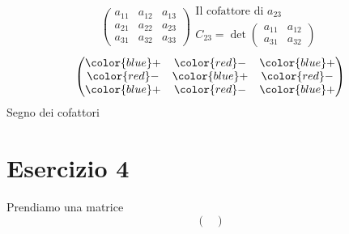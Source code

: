 \begin{equation*}
  \begin{pmatrix}
    a_{11} & a_{12} & a_{13}\\
    a_{21} & a_{22} & a_{23}\\
    a_{31} & a_{32} & a_{33}
  \end{pmatrix}
  \begin{array}{c}
    \text{Il cofattore di } a_{23}\\
    C_{23} = \det
    \begin{pmatrix}
      a_{11} & a_{12}\\
      a_{31} & a_{32}
    \end{pmatrix}
  \end{array}
\end{equation*}
\begin{equation*}
  \begin{pmatrix}
    {\color{blue}+} & {\color{red}-} &  {\color{blue}+}\\
    {\color{red}-} &{\color{blue}+}& {\color{red}-}\\
    {\color{blue}+} & {\color{red}-} &  {\color{blue}+}
  \end{pmatrix}
\end{equation*}
Segno dei cofattori

\section{Esercizio 4}
\label{sec:esercizio4}
Prendiamo una matrice
\begin{equation*}
  \begin{pmatrix}
    
  \end{pmatrix}
\end{equation*}
